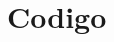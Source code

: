 \documentclass[a4paper,titlepage,10pt]{article}
\begin{document}

\maketitle

\section{Codigo}





\newpage



\newpage



\newpage


\end{document}

